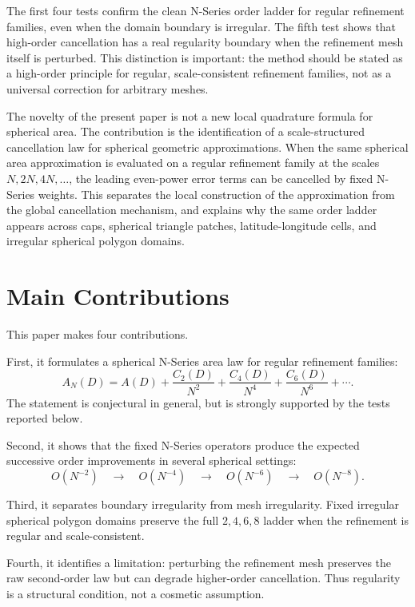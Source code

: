 \documentclass[11pt]{article}
\begin{document}
The first four tests confirm the clean N-Series order ladder for regular
refinement families, even when the domain boundary is irregular.  The fifth
test shows that high-order cancellation has a real regularity boundary when
the refinement mesh itself is perturbed.  This distinction is important: the
method should be stated as a high-order principle for regular,
scale-consistent refinement families, not as a universal correction for
arbitrary meshes.

The novelty of the present paper is not a new local quadrature formula for spherical area.  The contribution is the identification of a scale-structured cancellation law for spherical geometric approximations.  When the same spherical area approximation is evaluated on a regular refinement family at the scales \(N,2N,4N,\ldots\), the leading even-power error terms can be cancelled by fixed N-Series weights.  This separates the local construction of the approximation from the global cancellation mechanism, and explains why the same order ladder appears across caps, spherical triangle patches, latitude-longitude cells, and irregular spherical polygon domains.


\section{Main Contributions}

This paper makes four contributions.

First, it formulates a spherical N-Series area law for regular refinement
families:
\[
  A_N(D)
  =
  A(D)
  +
  \frac{C_2(D)}{N^2}
  +
  \frac{C_4(D)}{N^4}
  +
  \frac{C_6(D)}{N^6}
  +
  \cdots .
\]
The statement is conjectural in general, but is strongly supported by the
tests reported below.

Second, it shows that the fixed N-Series operators produce the expected
successive order improvements in several spherical settings:
\[
  O(N^{-2})
  \quad\longrightarrow\quad
  O(N^{-4})
  \quad\longrightarrow\quad
  O(N^{-6})
  \quad\longrightarrow\quad
  O(N^{-8}).
\]

Third, it separates boundary irregularity from mesh irregularity.  Fixed
irregular spherical polygon domains preserve the full $2,4,6,8$ ladder when
the refinement is regular and scale-consistent.

Fourth, it identifies a limitation: perturbing the refinement mesh preserves
the raw second-order law but can degrade higher-order cancellation.  Thus
regularity is a structural condition, not a cosmetic assumption.
\end{document}
